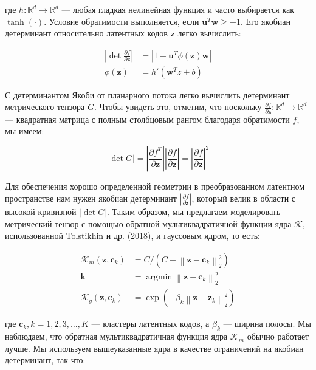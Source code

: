 \documentclass{article}
\begin{document}
где \(h: \mathbb{R}^d \rightarrow \mathbb{R}^d\) — любая гладкая нелинейная функция и часто выбирается как \(\tanh(\cdot)\). Условие обратимости выполняется, если \(\mathbf{u}^T \mathbf{w} \geq -1\). Его якобиан детерминант относительно латентных кодов \(\mathbf{z}\) легко вычислить:

\[
\begin{aligned}
\left| \det \frac{\partial f}{\partial \mathbf{z}} \right| & = \left| 1 + \mathbf{u}^T \phi(\mathbf{z}) \mathbf{w} \right| \\
\phi(\mathbf{z}) & = h'(\mathbf{w}^T z + b)
\end{aligned}
\]

С детерминантом Якоби от планарного потока легко вычислить детерминант метрического тензора \(G\). Чтобы увидеть это, отметим, что поскольку \(\frac{\partial f}{\partial \mathbf{z}}: \mathbb{R}^d \rightarrow \mathbb{R}^d\) — квадратная матрица с полным столбцовым рангом благодаря обратимости \(f\), мы имеем:

\[
\left| \det G \right| = \left| \frac{\partial f^T}{\partial \mathbf{z}} \right| \left| \frac{\partial f}{\partial \mathbf{z}} \right| = \left| \frac{\partial f}{\partial \mathbf{z}} \right|^2
\]

Для обеспечения хорошо определенной геометрии в преобразованном латентном пространстве нам нужен якобиан детерминант \(\left| \frac{\partial f}{\partial \mathbf{z}} \right|\), который велик в области с высокой кривизной \(\left| \det G \right|\). Таким образом, мы предлагаем моделировать метрический тензор с помощью обратной мультиквадратичной функции ядра \(\mathcal{K}\), использованной Tolstikhin и др. (2018), и гауссовым ядром, то есть:

\[
\begin{aligned}
\mathcal{K}_m(\mathbf{z}, \mathbf{c}_k) & = C / (C + \left\| \mathbf{z} - \mathbf{c}_k \right\|_2^2) \\
\mathbf{k} & = \operatorname{argmin} \left\| \mathbf{z} - \mathbf{c}_k \right\|_2^2 \\
\mathcal{K}_g(\mathbf{z}, \mathbf{c}_k) & = \exp(-\beta_k \left\| \mathbf{z} - \mathbf{z}_k \right\|_2^2)
\end{aligned}
\]

где \(\mathbf{c}_k, k = 1, 2, 3, \ldots, K\) — кластеры латентных кодов, а \(\beta_k\) — ширина полосы. Мы наблюдаем, что обратная мультиквадратичная функция ядра \(\mathcal{K}_m\) обычно работает лучше. Мы используем вышеуказанные ядра в качестве ограничений на якобиан детерминант, так что:
\end{document}
